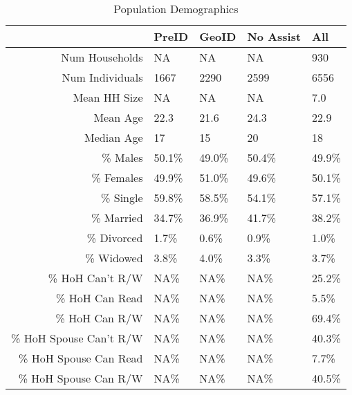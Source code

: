 \begin{table}[ht]
\centering
\begin{tabular}{rllll}
  \hline
 & PreID & GeoID & No Assist & All \\ 
  \hline
Num Households & NA  & NA  & NA  & 930 \\ 
  Num Individuals & 1667 & 2290 & 2599 & 6556 \\ 
  Mean HH Size & NA & NA & NA & 7.0 \\ 
  Mean Age & 22.3 & 21.6 & 24.3 & 22.9 \\ 
  Median Age & 17 & 15 & 20 & 18 \\ 
  \% Males & 50.1\% & 49.0\% & 50.4\% & 49.9\% \\ 
  \% Females & 49.9\% & 51.0\% & 49.6\% & 50.1\% \\ 
  \% Single & 59.8\% & 58.5\% & 54.1\% & 57.1\% \\ 
  \% Married & 34.7\% & 36.9\% & 41.7\% & 38.2\% \\ 
  \% Divorced & 1.7\% & 0.6\% & 0.9\% & 1.0\% \\ 
  \% Widowed & 3.8\% & 4.0\% & 3.3\% & 3.7\% \\ 
  \% HoH Can't R/W & NA\% & NA\% & NA\% & 25.2\% \\ 
  \% HoH Can Read & NA\% & NA\% & NA\% & 5.5\% \\ 
  \% HoH Can R/W & NA\% & NA\% & NA\% & 69.4\% \\ 
  \% HoH Spouse Can't R/W & NA\% & NA\% & NA\% & 40.3\% \\ 
  \% HoH Spouse Can Read & NA\% & NA\% & NA\% & 7.7\% \\ 
  \% HoH Spouse Can R/W & NA\% & NA\% & NA\% & 40.5\% \\ 
   \hline
\end{tabular}
\caption{Population Demographics} 
\end{table}
